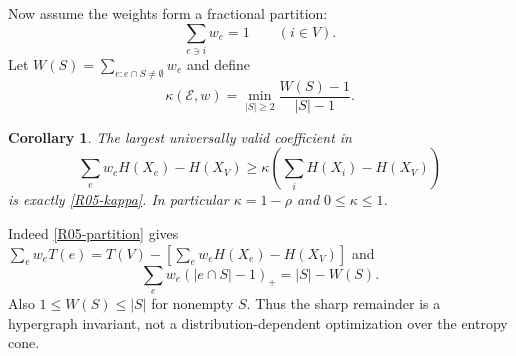 \documentclass[11pt,a4paper]{article}
\newtheorem{corollary}[theorem]{Corollary}
\theoremstyle{definition}\newtheorem{definition}[theorem]{Definition}
\theoremstyle{remark}\newtheorem{remark}[theorem]{Remark}
\numberwithin{equation}{section}
\begin{document}
Now assume the weights form a fractional partition:
\begin{equation}\label{R05-partition}
\sum_{e\ni i}w_e=1\qquad(i\in V).
\end{equation}
Let $W(S)=\sum_{e:e\cap S\ne\emptyset}w_e$ and define
\begin{equation}\label{R05-kappa}
\kappa(\mathcal E,w)=\min_{|S|\geq2}\frac{W(S)-1}{|S|-1}.
\end{equation}
\begin{corollary}\label{R05-sharp}
The largest universally valid coefficient in
\begin{equation}\label{R05-stability}
\sum_e w_eH(X_e)-H(X_V)\geq\kappa\left(\sum_iH(X_i)-H(X_V)\right)
\end{equation}
is exactly \eqref{R05-kappa}. In particular $\kappa=1-\rho$ and $0\leq\kappa\leq1$.
\end{corollary}
Indeed \eqref{R05-partition} gives $\sum_e w_eT(e)=T(V)-[\sum_e w_eH(X_e)-H(X_V)]$ and
\[
\sum_e w_e(|e\cap S|-1)_+=|S|-W(S).
\]
Also $1\leq W(S)\leq|S|$ for nonempty $S$. Thus the sharp remainder is a hypergraph invariant, not a distribution-dependent optimization over the entropy cone.
\end{document}
